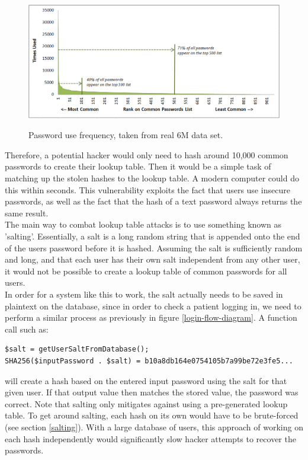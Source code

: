 \documentclass[11pt]{article}
\begin{document}
\begin{figure}[ht]
\centering
\includegraphics[scale=0.4]{passwordsfreq}
\caption{Password use frequency, taken from real 6M data set.}
\cite[image licensed under CC BY-SA 3.0]{xato:top-passwords}
\label{password-use-frequency}
\end{figure}

Therefore, a potential hacker would only need to hash around 10,000 common passwords to create their lookup table. Then it would be a simple task of matching up the stolen hashes to the lookup table. A modern computer could do this within seconds. This vulnerability exploits the fact that users use insecure passwords, as well as the fact that the hash of a text password always returns the same result. 
\\ \indent
The main way to combat lookup table attacks is to use something known as 'salting'. Essentially, a salt is a long random string that is appended onto the end of the users password before it is hashed. Assuming the salt is sufficiently random and long, and that each user has their own salt independent from any other user, it would not be possible to create a lookup table of common passwords for all users. 
\\ \indent 
In order for a system like this to work, the salt actually needs to be saved in plaintext on the database, since in order to check a patient logging in, we need to perform a similar process as previously in figure \ref{login-flow-diagram}. A function call such as:

\begin{lstlisting}
$salt = getUserSaltFromDatabase();
SHA256($inputPassword . $salt) = b10a8db164e0754105b7a99be72e3fe5...
\end{lstlisting}

will create a hash based on the entered input password using the salt for that given user. If that output value then matches the stored value, the password was correct. Note that salting only mitigates against using a pre-generated lookup table. To get around salting, each hash on its own would have to be brute-forced (see section \ref{salting}). With a large database of users, this approach of working on each hash independently would significantly slow hacker attempts to recover the passwords.
\end{document}
